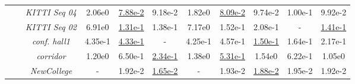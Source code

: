 \begin{table}[t]
\begin{tabular}{c|c||c|c|c||c|c|c|c|c}
		\midrule
		\  \parbox[t]{1mm}{}\ 
				
		& \textit{KITTI Seq 04} 	& 2.06e0 	& \underline{7.88e-2} 	& 9.18e-2  & \textcolor{f0}{1.82e0} & \underline{\textcolor{f0}{8.09e-2}}&\textcolor{f0}{9.74e-2} & \textcolor{f0}{1.00e-1} &  \textcolor{f0}{9.92e-2} \\ 
		
		& \textit{KITTI Seq 02}		& 6.91e0		& \underline{1.31e-1}		& 1.38e-1	 & \textcolor{f0}{7.17e0} & \textcolor{f0}{1.52e-1}& \textcolor{f2}{2.08e-1} & - &  \underline{\textcolor{f3}{1.41e-1}}\\	
		
		& \textit{conf. hall1} 		& 4.35e-1  & \underline{4.33e-1}	& -	 & \textcolor{f0}{4.25e-1}& \textcolor{f0}{4.57e-1}& \underline{\textcolor{f4}{1.50e-1}}& \textcolor{f0}{1.64e-1}& \textcolor{f1}{2.17e-1}\\%
		
		& \textit{corridor}			& 1.20e0	&	6.50e-1		&	\underline{2.34e-1}	 & \textcolor{f0}{1.38e0}& \underline{\textcolor{f0}{5.31e-1}}& \textcolor{f4}{1.54e0}& \textcolor{f0}{6.22e-1}& \textcolor{f1}{1.05e0}\\
		
		& \textit{NewCollege}  		& -        & 1.92e-2   & \underline{1.65e-2}  & - & \textcolor{f0}{1.93e-2} & \underline{\textcolor{f1}{1.88e-2}}& \textcolor{f0}{1.95e-2}&  \textcolor{f0}{1.92e-2}\\ 	
		\midrule[0.1pt]
 	\bottomrule	[1pt]
	\end{tabular} 
	\label{tab:accuracy_summary}
\end{table}
\documentclass[letterpaper, 10 pt, conference]{ieeeconf}  %


\IEEEoverridecommandlockouts                              %

\overrideIEEEmargins                                      %


\usepackage{graphicx} 

\usepackage{amsmath,amssymb,amsfonts}
\usepackage{cite}
\usepackage{multirow}
\usepackage{algorithmic}
\usepackage[ruled,vlined,lined,linesnumbered,boxed,commentsnumbered]{algorithm2e}
\usepackage{booktabs}
\usepackage[caption=false]{subfig}
\usepackage{color}
\usepackage{balance}
\usepackage{threeparttable}
\usepackage{rotating}
\usepackage{pifont}
\usepackage[dvipsnames]{xcolor}
 

